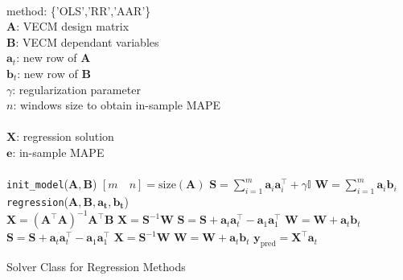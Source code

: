 \documentclass[twocolumn]{svjour3}          %
\begin{document}
\begin{algorithm}[ht]
\begin{algorithmic}[1]
\REQUIRE $\,$ \\
method: \{'OLS','RR','AAR'\} \\
$\mathbf{A}$: VECM design matrix \\
$\mathbf{B}$: VECM dependant variables \\
$\mathbf{a}_t$: new row of $\mathbf{A}$ \\
$\mathbf{b}_t$: new row of $\mathbf{B}$ \\
$\gamma$: regularization parameter \\
$n$: windows size to obtain in-sample MAPE \\
\ENSURE  $\,$ \\
$\mathbf{X}$: regression solution \\
$\mathbf{e}$: in-sample MAPE \\
\quad \\
\texttt{init\_model}($\mathbf{A},\mathbf{B}$)
\STATE $ [m \quad n] = \text{size}(\mathbf{A}) $ 
\STATE $\mathbf{S} = \displaystyle \sum_{i=1}^m \mathbf{a}_i \mathbf{a}_i^\top + \gamma \mathbb{I}$
\STATE $\mathbf{W} = \displaystyle \sum_{i=1}^m \mathbf{a}_i \mathbf{b}_i$
\quad \\
\texttt{regression}($\mathbf{A},\mathbf{B},\mathbf{a_t},\mathbf{b_t}$) \\
        \STATE $\mathbf{X}=(\mathbf{A}^\top \mathbf{A})^{-1}\mathbf{A}^\top
        \mathbf{B}$
        \STATE $\mathbf{X} = \mathbf{S}^{-1} \mathbf{W} $
        \STATE $\mathbf{S} = \mathbf{S}+
        \mathbf{a}_t \mathbf{a}_t^\top-
        \mathbf{a}_1 \mathbf{a}_1^\top$
        \STATE $\mathbf{W} = \mathbf{W} + \mathbf{a}_t \mathbf{b}_t$
        \STATE $\mathbf{S} = \mathbf{S}+
        \mathbf{a}_t \mathbf{a}_t^\top-
        \mathbf{a}_1 \mathbf{a}_1^\top$
        \STATE $\mathbf{X} = \mathbf{S}^{-1} \mathbf{W} $
        \STATE $\mathbf{W} = \mathbf{W} + \mathbf{a}_t \mathbf{b}_t$
\ENDIF
\STATE $\mathbf{y}_{\text{pred}} = \mathbf{X}^\top \mathbf{a}_t$
\end{algorithmic}
\caption{Solver Class for Regression Methods}
\label{alg:solver}
\end{algorithm}
\end{document}
